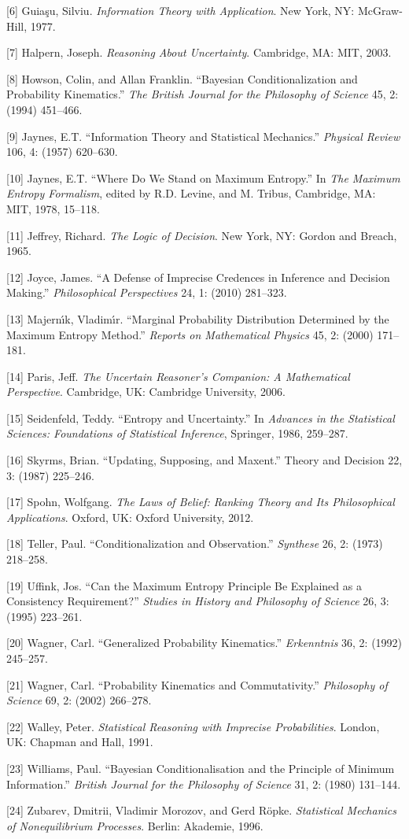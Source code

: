 [6] Guia{\c{s}}u, Silviu. \emph{Information Theory with Application}. New York, NY: McGraw-Hill, 1977. 

[7] Halpern, Joseph. \emph{Reasoning About Uncertainty}. Cambridge, MA: MIT, 2003.

[8] Howson, Colin, and Allan Franklin. ``Bayesian Conditionalization and Probability Kinematics.'' \emph{The British Journal for the Philosophy of Science} 45, 2: (1994) 451--466.

[9] Jaynes, E.T. ``Information Theory and Statistical Mechanics.'' \emph{Physical Review} 106, 4: (1957) 620--630.

[10] Jaynes, E.T. ``Where Do We Stand on Maximum Entropy.'' In \emph{The Maximum Entropy Formalism}, edited by R.D. Levine, and M. Tribus, Cambridge, MA: MIT, 1978, 15--118.

[11] Jeffrey, Richard. \emph{The Logic of Decision}. New York, NY: Gordon and Breach, 1965.

[12] Joyce, James. ``A Defense of Imprecise Credences in Inference and Decision Making.'' \emph{Philosophical Perspectives} 24, 1: (2010) 281--323.

[13] Majern{\'\i}k, Vladim{\'\i}r. ``Marginal Probability Distribution Determined by the Maximum Entropy Method.'' \emph{Reports on Mathematical Physics} 45, 2: (2000) 171--181.

[14] Paris, Jeff. \emph{The Uncertain Reasoner's Companion: A Mathematical Perspective}. Cambridge, UK: Cambridge University, 2006.

[15] Seidenfeld, Teddy. ``Entropy and Uncertainty.'' In \emph{Advances in the Statistical Sciences: Foundations of Statistical Inference}, Springer, 1986, 259--287.

[16] Skyrms, Brian. ``Updating, Supposing, and Maxent.'' Theory and Decision 22, 3: (1987) 225--246.

[17] Spohn, Wolfgang. \emph{The Laws of Belief: Ranking Theory and Its Philosophical Applications}. Oxford, UK: Oxford University, 2012.

[18] Teller, Paul. ``Conditionalization and Observation.'' \emph{Synthese} 26, 2: (1973) 218--258.

[19] Uffink, Jos. ``Can the Maximum Entropy Principle Be Explained as a Consistency Requirement?'' \emph{Studies in History and Philosophy of Science} 26, 3: (1995) 223--261.

[20] Wagner, Carl. ``Generalized Probability Kinematics.'' \emph{Erkenntnis} 36, 2: (1992) 245--257.

[21] Wagner, Carl. ``Probability Kinematics and Commutativity.'' \emph{Philosophy of Science} 69, 2: (2002) 266--278.

[22] Walley, Peter. \emph{Statistical Reasoning with Imprecise Probabilities}. London, UK: Chapman and Hall, 1991.

[23] Williams, Paul. ``Bayesian Conditionalisation and the Principle of Minimum Information.'' \emph{British Journal for the Philosophy of Science} 31, 2: (1980) 131--144.

[24] Zubarev, Dmitrii, Vladimir Morozov, and Gerd R{\"o}pke. \emph{Statistical Mechanics of Nonequilibrium Processes}. Berlin: Akademie, 1996.
